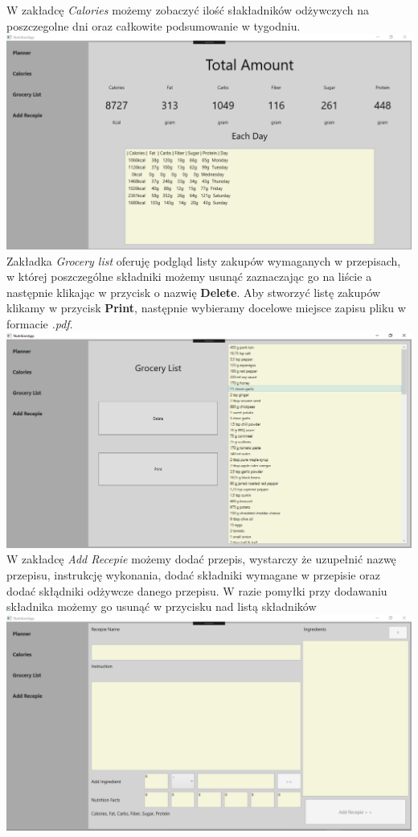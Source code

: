 \documentclass[12pt,a4paper]{article}
\begin{document}
	W zakładcę \textit{Calories} możemy zobaczyć ilość słakładników odżywczych na poszczegolne dni oraz całkowite podsumowanie
	w tygodniu.\\
	\includegraphics[scale = 0.5]{img/Calories.png} \\
	
	Zakładka \textit{Grocery list} oferuję podgląd listy zakupów wymaganych w przepisach, w której poszczególne składniki 
	możemy usunąć zaznaczając go na liście a następnie klikając w przycisk o nazwię \textbf{Delete}.
	Aby stworzyć listę zakupów klikamy w przycisk \textbf{Print}, następnie wybieramy docelowe miejsce zapisu pliku w formacie 
	\textit{.pdf}. \\
	\includegraphics[scale = 0.5]{img/GroceryList}\\ 

	W zakładcę \textit{Add Recepie} możemy dodać przepis, wystarczy że uzupełnić nazwę przepisu, instrukcję wykonania, 
	dodać składniki wymagane w przepisie oraz dodać skłądniki odżywcze danego przepisu. W razie pomyłki przy dodawaniu 
	składnika możemy go usunąć w przycisku nad listą składników \\
	\includegraphics[scale = 0.5]{img/AddRecepie.png} \\
	\newpage
\end{document}
